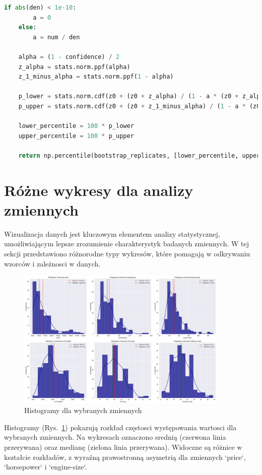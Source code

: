 \documentclass[12pt,a4paper]{article}
\begin{document}
\begin{lstlisting}[language=Python, caption=Funkcje do obliczania przedziałów ufnosci]
    if abs(den) < 1e-10:
        a = 0
    else:
        a = num / den
    
    alpha = (1 - confidence) / 2
    z_alpha = stats.norm.ppf(alpha)
    z_1_minus_alpha = stats.norm.ppf(1 - alpha)
    
    p_lower = stats.norm.cdf(z0 + (z0 + z_alpha) / (1 - a * (z0 + z_alpha)))
    p_upper = stats.norm.cdf(z0 + (z0 + z_1_minus_alpha) / (1 - a * (z0 + z_1_minus_alpha)))
    
    lower_percentile = 100 * p_lower
    upper_percentile = 100 * p_upper
    
    return np.percentile(bootstrap_replicates, [lower_percentile, upper_percentile])
\end{lstlisting}

\section{Różne wykresy dla analizy zmiennych}

Wizualizacja danych jest kluczowym elementem analizy statystycznej, umożliwiającym lepsze zrozumienie charakterystyk badanych zmiennych. W tej sekcji przedstawiono różnorodne typy wykresów, które pomagają w odkrywaniu wzorców i zależnosci w danych.

\begin{figure}[H]
    \centering
    \includegraphics[width=0.9\textwidth]{figures/histograms.png}
    \caption{Histogramy dla wybranych zmiennych}
    \label{fig:histograms}
\end{figure}

Histogramy (Rys.~\ref{fig:histograms}) pokazują rozkład częstosci występowania wartosci dla wybranych zmiennych. Na wykresach oznaczono srednią (czerwona linia przerywana) oraz medianę (zielona linia przerywana). Widoczne są różnice w kształcie rozkładów, z wyraźną prawostronną asymetrią dla zmiennych `price`, `horsepower` i `engine-size`.
\end{document}
